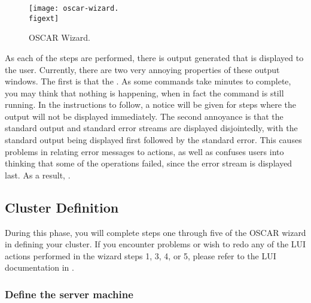\begin{figure}[htbp]
  \begin{center}
    \texttt{[image: oscar-wizard.\\figext]}
    \caption{OSCAR Wizard.}
    \label{fig:detailed-oscar-wizard}
  \end{center}
\end{figure}
  
As each of the steps are performed, there is output generated that is
displayed to the user. Currently, there are two very annoying
properties of these output windows. The first is that the .  As some
commands take minutes to complete, you may think that nothing is
happening, when in fact the command is still running. In the
instructions to follow, a notice will be given for steps where the
output will not be displayed immediately. The second annoyance is that
the standard output and standard error streams are displayed
disjointedly, with the standard output being displayed first followed
by the standard error. This causes problems in relating error messages
to actions, as well as confuses users into thinking that some of the
operations failed, since the error stream is displayed last. As a
result, .


\subsection{Cluster Definition}
\label{sec:detailed-cluster-def}

During this phase, you will complete steps one through five of the
OSCAR wizard in defining your cluster. If you encounter problems or
wish to redo any of the LUI actions performed in the wizard steps 1,
3, 4, or 5, please refer to the LUI documentation in
.

\subsubsection{Define the server machine} 

